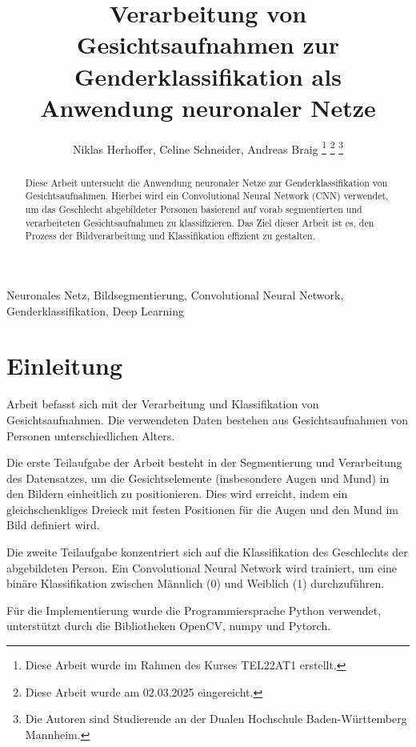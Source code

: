 \documentclass[journal,twoside,web]{ieeecolor}
\begin{document}
\title{Verarbeitung von Gesichtsaufnahmen zur Genderklassifikation als Anwendung neuronaler Netze}
\author{Niklas Herhoffer, Celine Schneider, Andreas Braig
\thanks{Diese Arbeit wurde im Rahmen des Kurses TEL22AT1 erstellt.}
\thanks{Diese Arbeit wurde am 02.03.2025 eingereicht.}  
\thanks{Die Autoren sind Studierende an der Dualen Hochschule Baden-Württemberg Mannheim.}}

\maketitle

\begin{abstract}
    Diese Arbeit untersucht die Anwendung neuronaler Netze zur Genderklassifikation von Gesichtsaufnahmen. Hierbei wird ein Convolutional Neural Network (CNN) verwendet, um das Geschlecht abgebildeter Personen basierend auf vorab segmentierten und verarbeiteten Gesichtsaufnahmen zu klassifizieren. Das Ziel dieser Arbeit ist es, den Prozess der Bildverarbeitung und Klassifikation effizient zu gestalten.
\end{abstract}


\begin{IEEEkeywords}
    Neuronales Netz, Bildsegmentierung, Convolutional Neural Network, Genderklassifikation, Deep Learning
\end{IEEEkeywords}

\section{Einleitung}
\label{sec:introduction}
 Arbeit befasst sich mit der Verarbeitung und Klassifikation von Gesichtsaufnahmen. Die verwendeten Daten bestehen aus Gesichtsaufnahmen von Personen unterschiedlichen Alters. 

Die erste Teilaufgabe der Arbeit besteht in der Segmentierung und Verarbeitung des Datensatzes, um die Gesichtselemente (insbesondere Augen und Mund) in den Bildern einheitlich zu positionieren. Dies wird erreicht, indem ein gleichschenkliges Dreieck mit festen Positionen für die Augen und den Mund im Bild definiert wird. 

Die zweite Teilaufgabe konzentriert sich auf die Klassifikation des Geschlechts der abgebildeten Person. Ein Convolutional Neural Network wird trainiert, um eine binäre Klassifikation zwischen Männlich (0) und Weiblich (1) durchzuführen.

Für die Implementierung wurde die Programmiersprache Python verwendet, unterstützt durch die Bibliotheken OpenCV, numpy und Pytorch.
\end{document}
